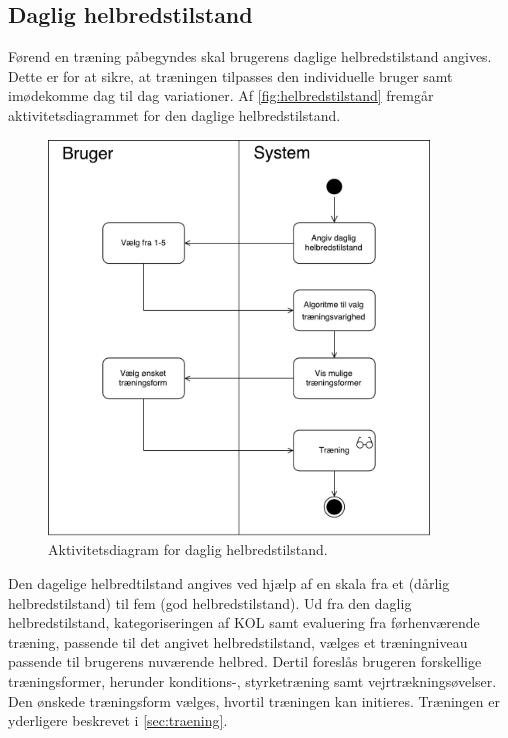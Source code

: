 \subsection{Daglig helbredstilstand}
Førend en træning påbegyndes skal brugerens daglige helbredstilstand angives. Dette er for at sikre, at træningen tilpasses den individuelle bruger samt imødekomme dag til dag variationer. Af \autoref{fig:helbredstilstand} fremgår aktivitetsdiagrammet for den daglige helbredstilstand. 

\begin{figure} [H]
\centering
\includegraphics[width=0.9\textwidth]{figures/aktivitetsdiagram/Helbredstilstand}
\caption{Aktivitetsdiagram for daglig helbredstilstand.}
\label{fig:helbredstilstand}
\end{figure}

Den dagelige helbredtilstand angives ved hjælp af en skala fra et (dårlig helbredstilstand) til fem (god helbredstilstand). Ud fra den daglig helbredstilstand, kategoriseringen af KOL samt evaluering fra førhenværende træning, passende til det angivet helbredstilstand, vælges et træningniveau passende til brugerens nuværende helbred. Dertil foreslås brugeren forskellige træningsformer, herunder konditions-, styrketræning samt vejrtrækningsøvelser. Den ønskede træningsform vælges, hvortil træningen kan initieres. Træningen er yderligere beskrevet i \autoref{sec:traening}. 
